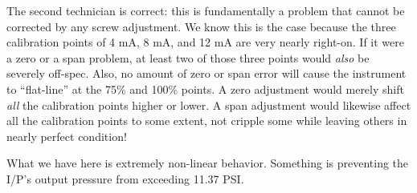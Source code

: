 The second technician is correct: this is fundamentally a problem that cannot be corrected by any screw adjustment.  We know this is the case because the three calibration points of 4 mA, 8 mA, and 12 mA are very nearly right-on.  If it were a zero or a span problem, at least two of those three points would {\it also} be severely off-spec.  Also, no amount of zero or span error will cause the instrument to ``flat-line'' at the 75\% and 100\% points.  A zero adjustment would merely shift {\it all} the calibration points higher or lower.  A span adjustment would likewise affect all the calibration points to some extent, not cripple some while leaving others in nearly perfect condition! 

What we have here is extremely non-linear behavior.  Something is preventing the I/P's output pressure from exceeding 11.37 PSI.  







